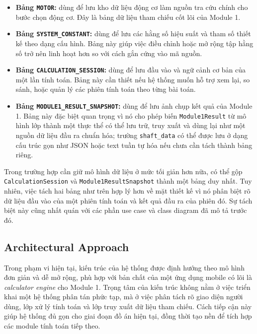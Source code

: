 \documentclass[a4paper]{article}
\begin{document}
\begin{itemize}
\item \textbf{Bảng \texttt{MOTOR}:} dùng để lưu kho dữ liệu động cơ làm nguồn tra cứu chính cho bước chọn động cơ. Đây là bảng dữ liệu tham chiếu cốt lõi của Module 1.

\item \textbf{Bảng \texttt{SYSTEM\_CONSTANT}:} dùng để lưu các hằng số hiệu suất và tham số thiết kế theo dạng cấu hình. Bảng này giúp việc điều chỉnh hoặc mở rộng tập hằng số trở nên linh hoạt hơn so với cách gắn cứng vào mã nguồn.

\item \textbf{Bảng \texttt{CALCULATION\_SESSION}:} dùng để lưu đầu vào và ngữ cảnh cơ bản của một lần tính toán. Bảng này cần thiết nếu hệ thống muốn hỗ trợ xem lại, so sánh, hoặc quản lý các phiên tính toán theo từng bài toán.

\item \textbf{Bảng \texttt{MODULE1\_RESULT\_SNAPSHOT}:} dùng để lưu ảnh chụp kết quả của Module 1. Bảng này đặc biệt quan trọng vì nó cho phép biến \texttt{Module1Result} từ mô hình lớp thành một thực thể có thể lưu trữ, truy xuất và dùng lại như một nguồn dữ liệu đầu ra chuẩn hóa; trường \texttt{shaft\_data} có thể được lưu ở dạng cấu trúc gọn như JSON hoặc text tuần tự hóa nếu chưa cần tách thành bảng riêng.
\end{itemize}

Trong trường hợp cần giữ mô hình dữ liệu ở mức tối giản hơn nữa, có thể gộp \texttt{CalculationSession} và \texttt{Module1ResultSnapshot} thành một bảng duy nhất. Tuy nhiên, việc tách hai bảng như trên hợp lý hơn về mặt thiết kế vì nó phân biệt rõ dữ liệu đầu vào của một phiên tính toán và kết quả đầu ra của phiên đó. Sự tách biệt này cũng nhất quán với các phần use case và class diagram đã mô tả trước đó.

\newpage
\subsection{Architectural Approach}

Trong phạm vi hiện tại, kiến trúc của hệ thống được định hướng theo mô hình đơn giản và dễ mở rộng, phù hợp với bản chất của một ứng dụng mobile có lõi là \textit{calculator engine} cho Module 1. Trọng tâm của kiến trúc không nằm ở việc triển khai một hệ thống phân tán phức tạp, mà ở việc phân tách rõ giao diện người dùng, lớp xử lý tính toán và lớp truy xuất dữ liệu tham chiếu. Cách tiếp cận này giúp hệ thống đủ gọn cho giai đoạn đồ án hiện tại, đồng thời tạo nền để tích hợp các module tính toán tiếp theo.
\end{document}

